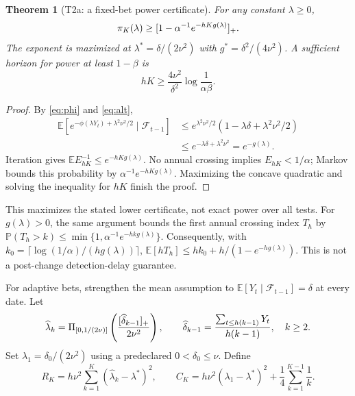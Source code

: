 \documentclass[11pt,a4paper]{article}
\newtheorem{theorem}{Theorem}
\theoremstyle{remark}\newtheorem{remark}[theorem]{Remark}
\newcommand{\E}{\mathbb E}\newcommand{\Prb}{\mathbb P}
\newcommand{\F}{\mathcal F}\newcommand{\G}{\mathcal G}\newcommand{\W}{\mathcal W}
\begin{document}
\begin{theorem}[T2a: a fixed-bet power certificate]
For any constant $\lambda\ge0$,
\begin{equation}
 \pi_K(\lambda)\ge[1-\alpha^{-1}e^{-hK g(\lambda)}]_+.
\end{equation}
The exponent is maximized at
$\lambda^*=\delta/(2\nu^2)$ with $g^*=\delta^2/(4\nu^2)$.
A sufficient horizon for power at least $1-\beta$ is
\begin{equation}
 hK\ge \frac{4\nu^2}{\delta^2}\log\frac1{\alpha\beta}.
\end{equation}
\end{theorem}
\begin{proof}
By \eqref{eq:phi} and \eqref{eq:alt},
\begin{align*}
 \E[e^{-\phi(\lambda Y_t)+\lambda^2\nu^2/2}\mid\F_{t-1}]
 &\le e^{\lambda^2\nu^2/2}(1-\lambda\delta+\lambda^2\nu^2/2)\\
 &\le e^{-\lambda\delta+\lambda^2\nu^2}=e^{-g(\lambda)}.
\end{align*}
Iteration gives $\E E_{hK}^{-1}\le e^{-hKg(\lambda)}$. No annual crossing
implies $E_{hK}<1/\alpha$; Markov bounds this probability by
$\alpha^{-1}e^{-hKg(\lambda)}$. Maximizing the concave quadratic and solving
the inequality for $hK$ finish the proof.
\end{proof}

This maximizes the stated lower certificate, not exact power over all tests.
For $g(\lambda)>0$, the same argument bounds the first annual crossing index
$T_h$ by $\Prb(T_h>k)\le\min\{1,\alpha^{-1}e^{-hkg(\lambda)}\}$.
Consequently, with $k_0=\lceil\log(1/\alpha)/(h g(\lambda))\rceil$,
$\E[hT_h]\le hk_0+h/(1-e^{-hg(\lambda)})$. This is not a post-change
detection-delay guarantee.

For adaptive bets, strengthen the mean assumption to
$\E[Y_t\mid\F_{t-1}]=\delta$ at every date. Let
\begin{equation}
 \widehat\lambda_k=\Pi_{[0,1/(2\nu)]}
 \left(\frac{[\widehat\delta_{k-1}]_+}{2\nu^2}\right),\qquad
 \widehat\delta_{k-1}=\frac{\sum_{t\le h(k-1)}Y_t}{h(k-1)},\quad k\ge2.
\end{equation}
Set $\lambda_1=\delta_0/(2\nu^2)$ using a predeclared $0<\delta_0\le\nu$.
Define
\begin{equation}
 R_K=h\nu^2\sum_{k=1}^K(\widehat\lambda_k-\lambda^*)^2,\qquad
 C_K=h\nu^2(\lambda_1-\lambda^*)^2+\frac14\sum_{k=1}^{K-1}\frac1k.
\end{equation}
\end{document}
